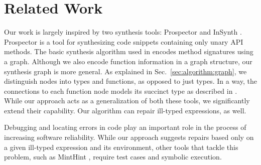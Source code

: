 \section{Related Work}
\label{sec:related}

Our work is largely inspired by two synthesis tools: Prospector \cite{MandelinetALL2005Jungloid} and InSynth \cite{GveroETAL13CompleteCompletionTypesWeights, DBLP:conf/cav/GveroKP11}. Prospector is a tool for synthesizing code snippets containing only unary API methods. The basic synthesis algorithm used in \cite{MandelinetALL2005Jungloid} encodes method signatures using a graph. Although we also encode function information in a graph structure, our synthesis graph is more general. As explained in Sec.~\ref{sec:algorithm:graph}, we distinguish nodes into types and functions, as opposed to just types. In a way, the connections to each function node models its succinct type as described in \cite{GveroETAL13CompleteCompletionTypesWeights}. While our approach acts as a generalization of both these tools, we significantly extend their capability. Our algorithm can repair ill-typed expressions, as well.

Debugging and locating errors in code \cite{Pavlinovic:2014, Chandra:2011:AD} play an important role in the process of increasing software reliability. While our approach suggests repairs based only on a given ill-typed expression and its environment, other tools that tackle this problem, such as MintHint \cite{MintHint}, require test cases and symbolic execution.

